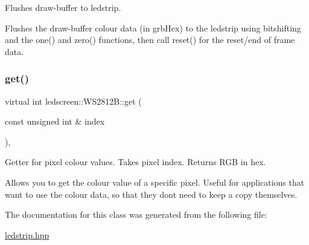 Flushes draw-\/buffer to ledstrip. 

Flushes the draw-\/buffer colour data (in grb\+Hex) to the ledstrip using bitshifting and the one() and zero() functions, then call reset() for the reset/end of frame data. \mbox{\label{classledscreen_1_1WS2812B_a79e2b0da57c6ff10a95de5751d97d342}} 
\subsubsection{\texorpdfstring{get()}{get()}}
{\footnotesize\ttfamily virtual int ledscreen\+::\+W\+S2812\+B\+::get (\begin{DoxyParamCaption}\item[{const unsigned int \&}]{index }\end{DoxyParamCaption})\hspace{0.3cm}{\ttfamily [inline]}, {\ttfamily [virtual]}}



Getter for pixel colour values. Takes pixel index. Returns R\+GB in hex. 

Allows you to get the colour value of a specific pixel. Useful for applications that want to use the colour data, so that they dont need to keep a copy themselves. 

The documentation for this class was generated from the following file\+:\begin{DoxyCompactItemize}
\item 
\hyperlink{ledstrip_8hpp}{ledstrip.\+hpp}\end{DoxyCompactItemize}
